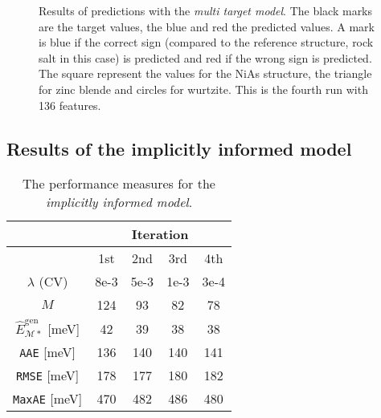 \begin{figure}[ht]
    \caption[Prediction results of the 4th iteration using the \emph{multi-target model}]{Results of predictions with the \emph{multi target model}. The black marks are the target values, the blue and red the predicted values. A mark is blue if the correct sign (compared to the reference structure, rock salt in this case) is predicted and red if the wrong sign is predicted. The square represent the values for the NiAs structure, the triangle for zinc blende and circles for wurtzite. This is the fourth run with 136 features.}
    \label{fig:multifourth}
\end{figure}






\subsection{Results of the implicitly informed model}\label{sec:ii_results}

\begin{table}[ht]
\centering
\begin{tabular}{c|cccc}
\toprule
 & \multicolumn{4}{c}{\textbf{Iteration}} \\
\hline
     & 1st & 2nd & 3rd & 4th  \\
   
   \midrule
   \hline
     $\lambda$ (CV) & 8e-3 & 5e-3 & 1e-3 & 3e-4 \\
    $M$ & 124 & 93 & 82 & 78 \\
   $\hat{E}_{\mathcal{M}*}^{\mathrm{gen}}$ [meV] & 42 & 39 & 38 & 38 \\
    \texttt{AAE} [meV]    & 136   & 140 & 140 & 141    \\
   \texttt{RMSE} [meV]   & 178      & 177  & 180 & 182     \\
   \texttt{MaxAE} [meV]  & 470  & 482 & 486 & 480        \\
    \hline
\bottomrule
   
\end{tabular}
\caption[Table of the different statistical measures calculated for the implicitly informed model]{The performance measures for the \emph{implicitly informed model}.}
\label{tab:table_results_big}
\end{table}



